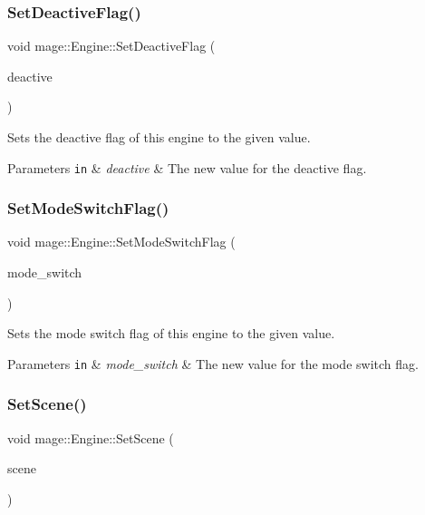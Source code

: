 \subsubsection{\texorpdfstring{Set\+Deactive\+Flag()}{SetDeactiveFlag()}}
{\footnotesize\ttfamily void mage\+::\+Engine\+::\+Set\+Deactive\+Flag (\begin{DoxyParamCaption}\item[{bool}]{deactive }\end{DoxyParamCaption})}

Sets the deactive flag of this engine to the given value.


\begin{DoxyParams}[1]{Parameters}
\mbox{\tt in}  & {\em deactive} & The new value for the deactive flag. \\
\hline
\end{DoxyParams}
\hypertarget{classmage_1_1_engine_a8b574f0d702240d76fa98b2c79856d0d}{}\label{classmage_1_1_engine_a8b574f0d702240d76fa98b2c79856d0d} 
\subsubsection{\texorpdfstring{Set\+Mode\+Switch\+Flag()}{SetModeSwitchFlag()}}
{\footnotesize\ttfamily void mage\+::\+Engine\+::\+Set\+Mode\+Switch\+Flag (\begin{DoxyParamCaption}\item[{bool}]{mode\+\_\+switch }\end{DoxyParamCaption})}

Sets the mode switch flag of this engine to the given value.


\begin{DoxyParams}[1]{Parameters}
\mbox{\tt in}  & {\em mode\+\_\+switch} & The new value for the mode switch flag. \\
\hline
\end{DoxyParams}
\hypertarget{classmage_1_1_engine_aec75ed67f8fb68a383fa892e50b21ea7}{}\label{classmage_1_1_engine_aec75ed67f8fb68a383fa892e50b21ea7} 
\subsubsection{\texorpdfstring{Set\+Scene()}{SetScene()}}
{\footnotesize\ttfamily void mage\+::\+Engine\+::\+Set\+Scene (\begin{DoxyParamCaption}\item[{\hyperlink{namespacemage_a1e01ae66713838a7a67d30e44c67703e}{Shared\+Ptr}$<$ \hyperlink{classmage_1_1_scene}{Scene} $>$}]{scene }\end{DoxyParamCaption})}

